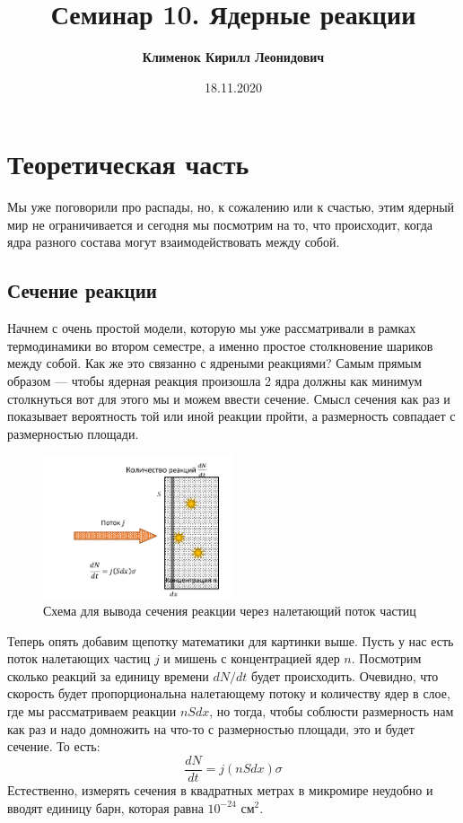 \documentclass[12pt]{article}
\begin{document}
 
\title{\textbf{Семинар 10. Ядерные реакции }}
\author{\textbf{Клименок Кирилл Леонидович}}
\date{18.11.2020}
\maketitle
\section{Теоретическая часть}
Мы уже поговорили про распады, но, к сожалению или к счастью, этим ядерный мир не ограничивается и сегодня мы посмотрим на то, что происходит, когда ядра разного состава могут взаимодействовать между собой.
\subsection{Сечение реакции}
Начнем с очень простой модели, которую мы уже рассматривали в рамках термодинамики во втором семестре, а именно простое столкновение шариков между собой. Как же это связанно с ядреными реакциями? Самым прямым образом --- чтобы ядерная реакция произошла 2 ядра должны как минимум столкнуться вот для этого мы и можем ввести сечение. Смысл сечения как раз и показывает вероятность той или иной реакции пройти, а размерность совпадает с размерностью площади.
\begin{figure}[h]
    \centering
    \includegraphics[width=0.5\textwidth,height=\textheight,keepaspectratio]{Seminar_10/pics/pic_01_sigma.pdf}
    \caption{Схема для вывода сечения реакции через налетающий поток частиц}
    \label{fig:sem_10_sigma}
\end{figure}
Теперь опять добавим щепотку математики для картинки выше. Пусть у нас есть поток налетающих частиц $j$ и мишень с концентрацией ядер $n$. Посмотрим сколько реакций за единицу времени $dN/dt$ будет происходить. Очевидно, что скорость будет пропорциональна налетающему потоку и количеству ядер в слое, где мы рассматриваем реакции $nSdx$, но тогда, чтобы соблюсти размерность нам как раз и надо домножить на что-то с размерностью площади, это и будет сечение. То есть:
\begin{equation*}
    \dfrac{dN}{dt} = j (nSdx) \sigma
\end{equation*}
Естественно, измерять сечения в квадратных метрах в микромире неудобно и вводят единицу барн, которая равна $10^{-24}$ $\text{см}^2$.
\end{document}
